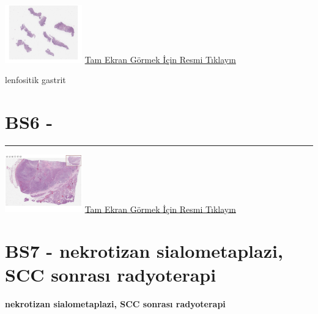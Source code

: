 \documentclass[
  letterpaper,
  DIV=11,
  numbers=noendperiod]{scrreprt}
\begin{document}
\href{https://images.patolojiatlasi.com/BS5/HE.html}{\includegraphics[width=0.25\textwidth,height=\textheight]{./screenshots/thumbnail_BS5-HE.png}}
\href{https://images.patolojiatlasi.com/BS5/HE.html}{Tam Ekran Görmek
İçin Resmi Tıklayın}

\begin{tcolorbox}[enhanced jigsaw, colbacktitle=quarto-callout-tip-color!10!white, colback=white, titlerule=0mm, opacityback=0, colframe=quarto-callout-tip-color-frame, opacitybacktitle=0.6, bottomrule=.15mm, breakable, coltitle=black, title=\textcolor{quarto-callout-tip-color}{\faLightbulb}\hspace{0.5em}{Tanı}, toprule=.15mm, toptitle=1mm, bottomtitle=1mm, arc=.35mm, rightrule=.15mm, leftrule=.75mm, left=2mm]

lenfositik gastrit

\end{tcolorbox}

\hypertarget{sec-BS6}{%
\section{BS6 -}\label{sec-BS6}}

\begin{center}\rule{0.5\linewidth}{0.5pt}\end{center}

\href{https://images.patolojiatlasi.com/BS6/HE.html}{\includegraphics[width=0.25\textwidth,height=\textheight]{./screenshots/thumbnail_BS6-HE.png}}
\href{https://images.patolojiatlasi.com/BS6/HE.html}{Tam Ekran Görmek
İçin Resmi Tıklayın}

\hypertarget{sec-BS7}{%
\section{BS7 - nekrotizan sialometaplazi, SCC sonrası
radyoterapi}\label{sec-BS7}}

\textbf{nekrotizan sialometaplazi, SCC sonrası radyoterapi}
\end{document}
